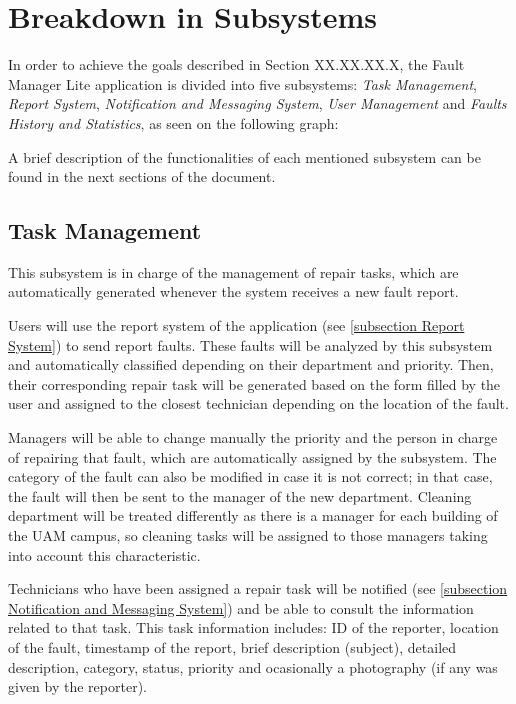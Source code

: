 \section{Breakdown in Subsystems}


In order to achieve the goals described in Section XX.XX.XX.X, the Fault Manager Lite application is divided into five subsystems: \emph{Task Management}, \emph{Report System}, \emph{Notification and Messaging System}, \emph{User Management} and \emph{Faults History and Statistics}, as seen on the following graph:


A brief description of the functionalities of each mentioned subsystem can be found in the next sections of the document.


\subsection{Task Management}
\label{subsection Task Management}

This subsystem is in charge of the management of repair tasks, which are automatically generated whenever the system receives a new fault report.

Users will use the report system of the application (see \ref{subsection Report System}) to send report faults. These faults will be analyzed by this subsystem and automatically classified depending on their department and priority. Then, their corresponding repair task will be generated based on the form filled by the user and assigned to the closest technician depending on the location of the fault.

Managers will be able to change manually the priority and the person in charge of repairing that fault, which are automatically assigned by the subsystem. The category of the fault can also be modified in case it is not correct; in that case, the fault will then be sent to the manager of the new department. Cleaning department will be treated differently as there is a manager for each building of the UAM campus, so cleaning tasks will be assigned to those managers taking into account this characteristic.

Technicians who have been assigned a repair task will be notified (see \ref{subsection Notification and Messaging System}) and be able to consult the information related to that task. This task information includes: ID of the reporter, location of the fault, timestamp of the report, brief description (subject), detailed description, category, status, priority and ocasionally a photography (if any was given by the reporter). 

